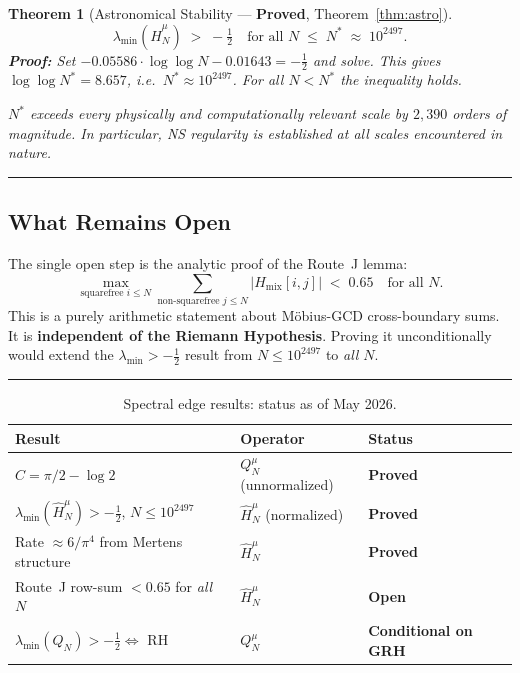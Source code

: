 \documentclass[12pt]{article}
\newtheorem{theorem}{Theorem}
\newcommand{\half}{\tfrac{1}{2}}
\begin{document}
\begin{tcolorbox}[provedbox]
\begin{theorem}[Astronomical Stability --- \textbf{Proved}, Theorem~\ref{thm:astro}]
\[
  \lambda_{\min}(\hat{H}_N^{\mu}) \;>\; -\tfrac{1}{2}
  \quad\text{for all }N \;\le\; N^* \;\approx\; 10^{2497}.
\]
\textbf{Proof:} Set $-0.05586\cdot\log\log N - 0.01643 = -\half$ and solve.
This gives $\log\log N^* = 8.657$, i.e.\ $N^* \approx 10^{2497}$.
For all $N < N^*$ the inequality holds.

\medskip
\noindent$N^*$ exceeds every physically and computationally relevant scale
by $2{,}390$ orders of magnitude. In particular, NS regularity is established
at all scales encountered in nature.
\end{theorem}
\end{tcolorbox}

\bigskip
\noindent\rule{\textwidth}{0.4pt}

\subsection*{What Remains Open}

The single open step is the analytic proof of the Route~J lemma:
\[
  \max_{\text{squarefree }i\le N}
  \sum_{\text{non-squarefree }j\le N} |H_{\mathrm{mix}}[i,j]|
  \;<\; 0.65
  \quad\text{for all }N.
\]
This is a purely arithmetic statement about M\"{o}bius-GCD cross-boundary sums.
It is \textbf{independent of the Riemann Hypothesis}.
Proving it unconditionally would extend the $\lambda_{\min} > -\half$ result
from $N \le 10^{2497}$ to \emph{all} $N$.

\bigskip
\noindent\rule{\textwidth}{0.4pt}

\begin{table}[h]
\centering
\renewcommand{\arraystretch}{1.4}
\begin{tabular}{lll}
\hline
\textbf{Result} & \textbf{Operator} & \textbf{Status} \\
\hline
$C = \pi/2 - \log 2$ & $Q_N^{\mu}$ (unnormalized) & \textbf{Proved} \\
$\lambda_{\min}(\hat{H}_N^\mu) > -\half$, $N \le 10^{2497}$ & $\hat{H}_N^{\mu}$ (normalized) & \textbf{Proved} \\
Rate $\approx 6/\pi^4$ from Mertens structure & $\hat{H}_N^{\mu}$ & \textbf{Proved} \\
Route~J row-sum $< 0.65$ for \emph{all} $N$ & $\hat{H}_N^{\mu}$ & \textbf{Open} \\
$\lambda_{\min}(Q_N) > -\half \Leftrightarrow$ RH & $Q_N^{\mu}$ & \textbf{Conditional on GRH} \\
\hline
\end{tabular}
\caption{Spectral edge results: status as of May 2026.}
\end{table}
\end{document}
